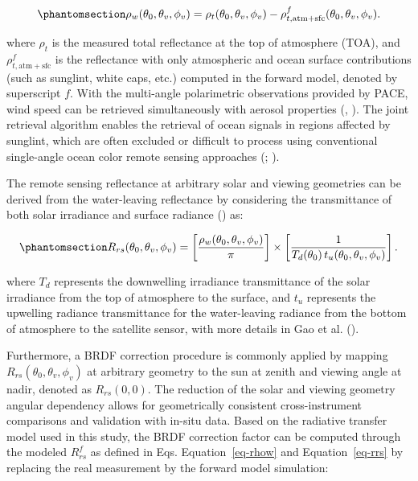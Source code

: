 \documentclass[
  11pt,
  letterpaper,
]{scrreprt}
\begin{document}
\begin{equation}\phantomsection\label{eq-rhow}{
\rho_w(\theta_0,\theta_v,\phi_v)
=
\rho_t(\theta_0,\theta_v,\phi_v)
-
\rho^{f}_{t,\mathrm{atm+sfc}}(\theta_0,\theta_v,\phi_v).
}\end{equation}

where \(\rho_t\) is the measured total reflectance at the top of
atmosphere (TOA), and \(\rho^{f}_{t,\mathrm{atm+sfc}}\) is the
reflectance with only atmospheric and ocean surface contributions (such
as sunglint, white caps, etc.) computed in the forward model, denoted by
superscript \(f\). With the multi-angle polarimetric observations
provided by PACE, wind speed can be retrieved simultaneously with
aerosol properties (,
). The joint retrieval algorithm enables
the retrieval of ocean signals in regions affected by sunglint, which
are often excluded or difficult to process using conventional
single-angle ocean color remote sensing approaches
(;
).

The remote sensing reflectance at arbitrary solar and viewing geometries
can be derived from the water-leaving reflectance by considering the
transmittance of both solar irradiance and surface radiance
() as:

\begin{equation}\phantomsection\label{eq-rrs}{
R_{rs}(\theta_0,\theta_v,\phi_v)
=
\left[
\frac{\rho_w(\theta_0,\theta_v,\phi_v)}{\pi}
\right]
\times
\left[
\frac{1}
{T_d(\theta_0)\,t_u(\theta_0,\theta_v,\phi_v)}
\right].
}\end{equation}

where \(T_d\) represents the downwelling irradiance transmittance of the
solar irradiance from the top of atmosphere to the surface, and \(t_u\)
represents the upwelling radiance transmittance for the water-leaving
radiance from the bottom of atmosphere to the satellite sensor, with
more details in Gao et al. ().

Furthermore, a BRDF correction procedure is commonly applied by mapping
\(R_{rs}(\theta_0, \theta_v, \phi_v)\) at arbitrary geometry to the sun
at zenith and viewing angle at nadir, denoted as \(R_{rs}(0,0)\). The
reduction of the solar and viewing geometry angular dependency allows
for geometrically consistent cross-instrument comparisons and validation
with in-situ data. Based on the radiative transfer model used in this
study, the BRDF correction factor can be computed through the modeled
\(R_{rs}^f\) as defined in Eqs. Equation~\ref{eq-rhow} and
Equation~\ref{eq-rrs} by replacing the real measurement by the forward
model simulation:
\end{document}
